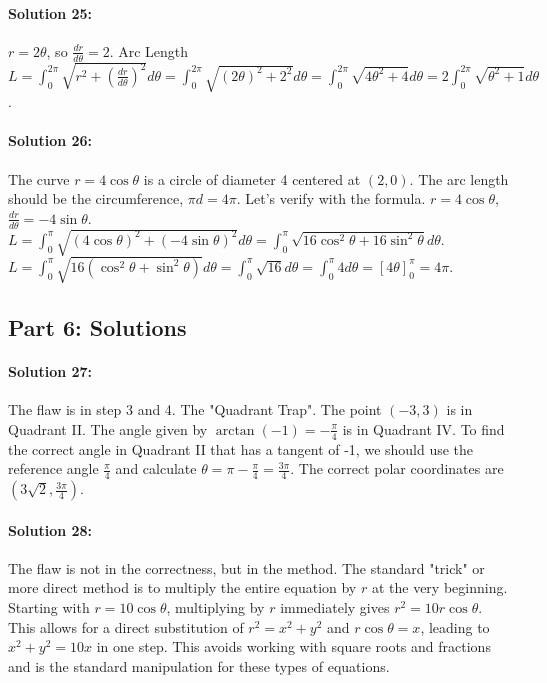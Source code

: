 \documentclass{article}
\begin{document}
\paragraph{Solution 25:} $r = 2\theta$, so $\frac{dr}{d\theta} = 2$.
Arc Length $L = \int_{0}^{2\pi} \sqrt{r^2 + (\frac{dr}{d\theta})^2} d\theta = \int_{0}^{2\pi} \sqrt{(2\theta)^2 + 2^2} d\theta = \int_{0}^{2\pi} \sqrt{4\theta^2 + 4} d\theta = 2\int_{0}^{2\pi} \sqrt{\theta^2 + 1} d\theta$.

\paragraph{Solution 26:} The curve $r=4\cos\theta$ is a circle of diameter 4 centered at $(2,0)$. The arc length should be the circumference, $\pi d = 4\pi$. Let's verify with the formula.
$r=4\cos\theta$, $\frac{dr}{d\theta} = -4\sin\theta$.
$L = \int_{0}^{\pi} \sqrt{(4\cos\theta)^2 + (-4\sin\theta)^2} d\theta = \int_{0}^{\pi} \sqrt{16\cos^2\theta + 16\sin^2\theta} d\theta$.
$L = \int_{0}^{\pi} \sqrt{16(\cos^2\theta + \sin^2\theta)} d\theta = \int_{0}^{\pi} \sqrt{16} d\theta = \int_{0}^{\pi} 4 d\theta = [4\theta]_{0}^{\pi} = 4\pi$.

\subsection*{Part 6: Solutions}

\paragraph{Solution 27:} The flaw is in step 3 and 4. The "Quadrant Trap". The point $(-3, 3)$ is in Quadrant II. The angle given by $\arctan(-1) = -\frac{\pi}{4}$ is in Quadrant IV. To find the correct angle in Quadrant II that has a tangent of -1, we should use the reference angle $\frac{\pi}{4}$ and calculate $\theta = \pi - \frac{\pi}{4} = \frac{3\pi}{4}$. The correct polar coordinates are $(3\sqrt{2}, \frac{3\pi}{4})$.

\paragraph{Solution 28:} The flaw is not in the correctness, but in the method. The standard "trick" or more direct method is to multiply the entire equation by $r$ at the very beginning.
Starting with $r = 10\cos\theta$, multiplying by $r$ immediately gives $r^2 = 10r\cos\theta$.
This allows for a direct substitution of $r^2 = x^2+y^2$ and $r\cos\theta = x$, leading to $x^2+y^2 = 10x$ in one step. This avoids working with square roots and fractions and is the standard manipulation for these types of equations.
\end{document}
